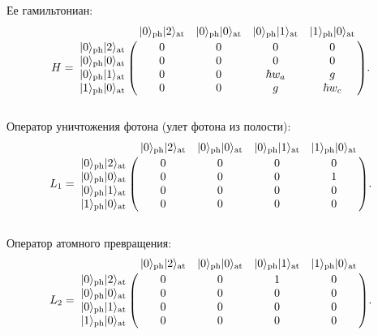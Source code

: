 \noindent Ее гамильтониан:\\
{\normalsize
	\[\label{ch:H}
	H = \bordermatrix
	{
		&                |0\ra_{\text{\text{ph}}}|2\ra_{\text{\text{at}}} & |0\ra_{\text{\text{ph}}}|0\ra_{\text{\text{at}}} & |0\ra_{\text{\text{ph}}}|1\ra_{\text{\text{at}}} & |1\ra_{\text{\text{ph}}}|0\ra_{\text{\text{at}}} \cr
		|0\ra_{\text{\text{ph}}}|2\ra_{\text{\text{at}}} &      0 &       	   0 &      0 & 0 \cr
		|0\ra_{\text{\text{ph}}}|0\ra_{\text{\text{at}}} &      0 &       	   0 &      0 & 0\cr
		|0\ra_{\text{\text{ph}}}|1\ra_{\text{\text{at}}} &      0 &  		   0 &      \hbar w_{a} & g\cr
		|1\ra_{\text{\text{ph}}}|0\ra_{\text{\text{at}}} &      0 &      	   0 &      g & \hbar w_{c}\cr
	}.
	\]
}
\
\\[18pt]

\noindent Оператор уничтожения фотона (улет фотона из полости):\\
{\normalsize
	\[\label{ch:L1}
	L_{1} = \bordermatrix
	{
		&                |0\ra_{\text{\text{ph}}}|2\ra_{\text{\text{at}}} & |0\ra_{\text{\text{ph}}}|0\ra_{\text{\text{at}}} & |0\ra_{\text{\text{ph}}}|1\ra_{\text{\text{at}}} & |1\ra_{\text{\text{ph}}}|0\ra_{\text{\text{at}}} \cr
		|0\ra_{\text{\text{ph}}}|2\ra_{\text{\text{at}}} &      0 &      0 &      0 & 0 \cr
		|0\ra_{\text{\text{ph}}}|0\ra_{\text{\text{at}}} &      0 &      0 &      0 & 1\cr
		|0\ra_{\text{\text{ph}}}|1\ra_{\text{\text{at}}} &      0 &      0 &      0 & 0\cr
		|1\ra_{\text{\text{ph}}}|0\ra_{\text{\text{at}}} &      0 &      0 &      0 & 0\cr
	}.
	\]
}
\\

\noindent Оператор атомного превращения:\\
{\normalsize
	\[\label{ch:L2}
	L_{2} = \bordermatrix
	{
		&                |0\ra_{\text{\text{ph}}}|2\ra_{\text{\text{at}}} & |0\ra_{\text{\text{ph}}}|0\ra_{\text{\text{at}}} & |0\ra_{\text{\text{ph}}}|1\ra_{\text{\text{at}}} & |1\ra_{\text{\text{ph}}}|0\ra_{\text{\text{at}}} \cr
		|0\ra_{\text{\text{ph}}}|2\ra_{\text{\text{at}}} &      0 &      0 &      1 & 0 \cr
		|0\ra_{\text{\text{ph}}}|0\ra_{\text{\text{at}}} &      0 &      0 &      0 & 0\cr
		|0\ra_{\text{\text{ph}}}|1\ra_{\text{\text{at}}} &      0 &      0 &      0 & 0\cr
		|1\ra_{\text{\text{ph}}}|0\ra_{\text{\text{at}}} &      0 &      0 &      0 & 0\cr
	}.
	\]
}
\\

